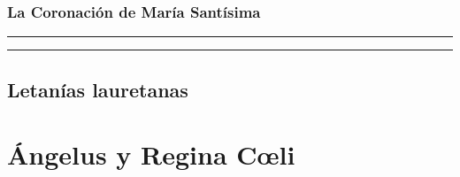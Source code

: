 \documentclass[11pt,a4paper]{report}
\begin{document}
    \subsubsection*{La Coronación de María Santísima}
    
    
    \rule{\textwidth}{0.5pt}
    
    \rule{\textwidth}{0.5pt}
    

    \subsection*{Letanías lauretanas}
    

    \section*{Ángelus y Regina Cœli}
    
\end{document}
